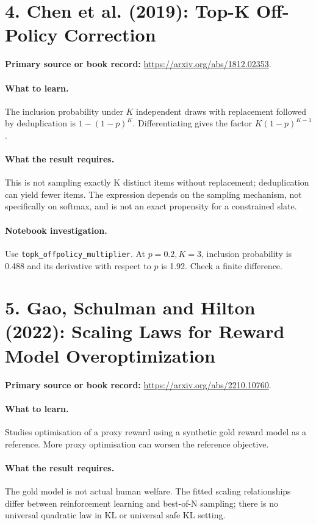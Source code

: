 \documentclass[11pt]{scrartcl}
\begin{document}
\section*{4. Chen et al. (2019): Top-K Off-Policy Correction}
\textbf{Primary source or book record:} \url{https://arxiv.org/abs/1812.02353}.

\paragraph{What to learn.} The inclusion probability under $K$ independent draws with replacement followed by deduplication is $1-(1-p)^K$. Differentiating gives the factor $K(1-p)^{K-1}$.

\paragraph{What the result requires.} This is not sampling exactly K distinct items without replacement; deduplication can yield fewer items. The expression depends on the sampling mechanism, not specifically on softmax, and is not an exact propensity for a constrained slate.

\paragraph{Notebook investigation.} Use \texttt{topk\_offpolicy\_multiplier}. At $p=0.2,K=3$, inclusion probability is 0.488 and its derivative with respect to $p$ is 1.92. Check a finite difference.

\section*{5. Gao, Schulman and Hilton (2022): Scaling Laws for Reward Model Overoptimization}
\textbf{Primary source or book record:} \url{https://arxiv.org/abs/2210.10760}.

\paragraph{What to learn.} Studies optimisation of a proxy reward using a synthetic gold reward model as a reference. More proxy optimisation can worsen the reference objective.

\paragraph{What the result requires.} The gold model is not actual human welfare. The fitted scaling relationships differ between reinforcement learning and best-of-N sampling; there is no universal quadratic law in KL or universal safe KL setting.
\end{document}
